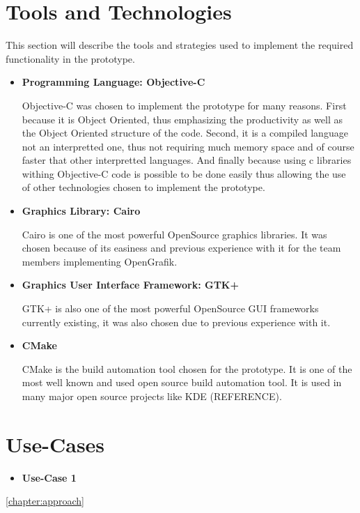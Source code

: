 \section{Tools and Technologies}
This section will describe the tools and strategies used to implement the required functionality in the prototype.
\begin{itemize}
\item {\bf Programming Language: Objective-C}
\par \noindent
Objective-C was chosen to implement the prototype for many reasons. First because it is Object Oriented, thus emphasizing the productivity as well as the Object Oriented structure of the code. Second, it is a compiled language not an interpretted one, thus not requiring much memory space and of course faster that other interpretted languages. And finally because using c libraries withing Objective-C code is possible to be done easily thus allowing the use of other technologies chosen to implement the prototype.

\item {\bf Graphics Library: Cairo}
\par \noindent
Cairo is one of the most powerful OpenSource graphics libraries. It was chosen because of its easiness and previous experience with it for the team members implementing OpenGrafik.

\item {\bf Graphics User Interface Framework: GTK+}
\par \noindent
GTK+ is also one of the most powerful OpenSource GUI frameworks currently existing, it was also chosen due to previous experience with it.

\item {\bf CMake}
\par \noindent
CMake is the build automation tool chosen for the prototype. It is one of the most well known and used open source build automation tool. It is used in many major open source projects like KDE (REFERENCE).
\end{itemize}

\section{Use-Cases}
\begin{itemize}
 \item {\bf Use-Case 1}
\end{itemize}


\ref{chapter:approach}